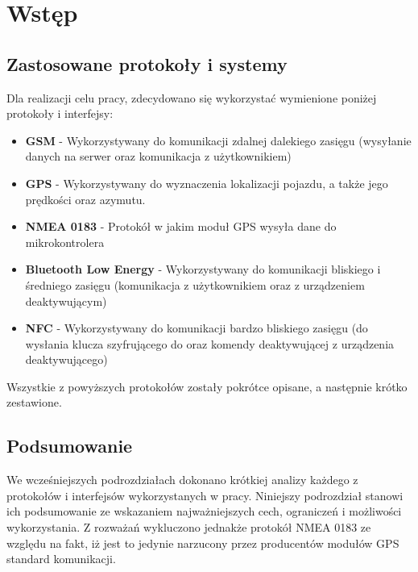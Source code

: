 \chapter{Wstęp}
\label{teorethical_introduction}

\section{Zastosowane protokoły i systemy}
Dla realizacji celu pracy, zdecydowano się wykorzystać wymienione poniżej protokoły i interfejsy:
\begin{itemize}
	\item \textbf{GSM} - Wykorzystywany do komunikacji zdalnej dalekiego zasięgu (wysyłanie danych na serwer oraz komunikacja z użytkownikiem)
	\item \textbf{GPS} - Wykorzystywany do wyznaczenia lokalizacji pojazdu, a także jego prędkości oraz azymutu.
	
	\item \textbf{NMEA 0183} - Protokół w jakim moduł GPS wysyła dane do mikrokontrolera
	\item \textbf{Bluetooth Low Energy} - Wykorzystywany do komunikacji bliskiego i średniego zasięgu (komunikacja z użytkownikiem oraz z urządzeniem deaktywującym)
	\item \textbf{NFC} - Wykorzystywany do komunikacji bardzo bliskiego zasięgu (do wysłania klucza szyfrującego do oraz komendy deaktywującej z urządzenia deaktywującego)
\end{itemize}

Wszystkie z powyższych protokołów zostały pokrótce opisane, a następnie krótko zestawione.

\clearpage











\clearpage
\section{Podsumowanie}

We wcześniejszych podrozdziałach dokonano krótkiej analizy każdego z protokołów i interfejsów wykorzystanych w pracy. Niniejszy podrozdział stanowi ich podsumowanie ze wskazaniem najważniejszych cech, ograniczeń i możliwości wykorzystania. Z rozważań wykluczono jednakże protokół NMEA 0183 ze względu na fakt, iż jest to jedynie narzucony przez producentów modułów GPS standard komunikacji.


